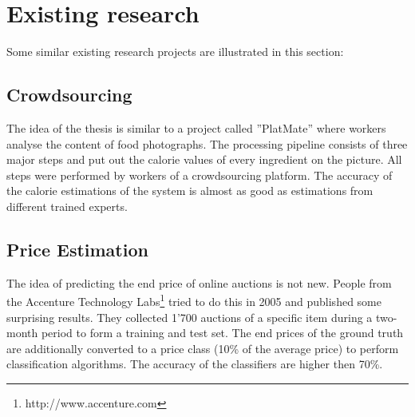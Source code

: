 \documentclass[a4paper]{report}
\begin{document}
\section{Existing research}
Some similar existing research projects are illustrated in this section: 
\subsection{Crowdsourcing}
The idea of the thesis is similar to a project called ''PlatMate''\cite{platemate} where workers analyse the content of food photographs. The processing pipeline consists of three major steps and put out the calorie values of every ingredient on the picture. All steps were performed by workers of a crowdsourcing platform. The accuracy of the calorie estimations of the system is almost as good as estimations from different trained experts. 
\subsection{Price Estimation}
The idea of predicting the end price of online auctions is not new. People from the Accenture Technology Labs\footnote{http://www.accenture.com} tried to do this in 2005 and published some surprising results\cite{ghani}. They collected 1'700 auctions of a specific item during a two-month period to form a training and test set. The end prices of the ground truth are additionally converted to a price class (10\% of the average price) to perform classification algorithms. The accuracy of the classifiers are higher then 70\%.
\end{document}
